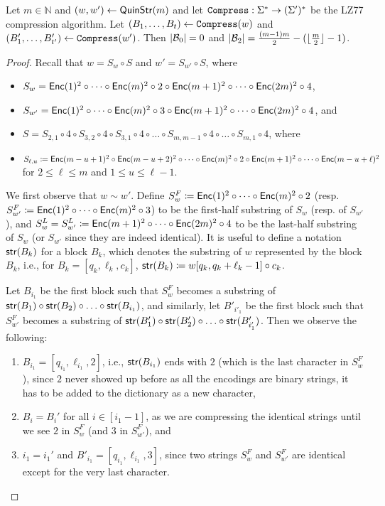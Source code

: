 \newcommand{\lemGS}{
Let $m\in\mathbb{N}$ and $(w,w')\gets\QuinStr(m)$ and let $\compress:\Sigma^*\rightarrow(\Sigma')^*$ be the LZ77 compression algorithm. Let $(B_1,\ldots,B_t)\gets\compress(w)$ and $(B'_1,\ldots,B'_{t'})\gets\compress(w')$. Then $|\B_0| = 0$ and $|\B_2| = \frac{(m-1)m}{2}-(\lfloor\frac{m}{2}\rfloor-1)$.
}
\begin{lemma}
    \lemGS
\end{lemma}

\begin{proof}
Recall that $w = S_w \circ S$ and $w' = S_{w'} \circ S$, where
\begin{itemize}
    \item $S_w =\mathsf{Enc}(1)^2\circ\cdots\circ\mathsf{Enc}(m)^2\circ 2 \circ\mathsf{Enc}(m+1)^2\circ\cdots\circ\mathsf{Enc}(2m)^2\circ 4$,
    \item $S_{w'}=\mathsf{Enc}(1)^2\circ\cdots\circ\mathsf{Enc}(m)^2\circ 3 \circ\mathsf{Enc}(m+1)^2\circ\cdots\circ\mathsf{Enc}(2m)^2\circ 4$, and
    \item $S=S_{2,1} \circ 4 \circ S_{3,2} \circ 4 \circ S_{3,1} \circ 4 \circ \ldots \circ S_{m,m-1} \circ 4 \circ \ldots \circ S_{m,1}\circ 4$, where
    \item $S_{\ell,u}\coloneqq\mathsf{Enc}(m-u+1)^2\circ\mathsf{Enc}(m-u+2)^2\circ\cdots\circ\mathsf{Enc}(m)^2\circ 2 \circ\mathsf{Enc}(m+1)^2\circ\cdots\circ\mathsf{Enc}(m-u+\ell)^2$ for $2\leq\ell\leq m$ and $1\leq u\leq \ell-1$.
\end{itemize}
We first observe that $w\sim w'$. Define $S_w^F\coloneqq \mathsf{Enc}(1)^2\circ\cdots\circ\mathsf{Enc}(m)^2\circ 2$ (resp. $S_{w'}^F\coloneqq \mathsf{Enc}(1)^2\circ\cdots\circ\mathsf{Enc}(m)^2\circ 3$) to be the first-half substring of $S_w$ (resp. of $S_{w'}$), and $S_w^L=S_{w'}^L\coloneqq \mathsf{Enc}(m+1)^2\circ\cdots\circ\mathsf{Enc}(2m)^2\circ 4$ to be the last-half substring of $S_w$ (or $S_{w'}$ since they are indeed identical). 
It is useful to define a notation $\mathsf{str}(B_k)$ for a block $B_k$, which denotes the substring of $w$ represented by the block $B_k$, i.e., for $B_k=[q_k,\ell_k,c_k]$, $\mathsf{str}(B_k)\coloneqq w[q_k,q_k+\ell_k-1]\circ c_k$. 

Let $B_{i_1}$ be the first block such that $S_w^F$ becomes a substring of $\mathsf{str}(B_1)\circ\mathsf{str}(B_2)\circ\ldots\circ\mathsf{str}(B_{i_1})$, and similarly, let $B'_{i'_1}$ be the first block such that $S_{w'}^F$ becomes a substring of $\mathsf{str}(B'_1)\circ\mathsf{str}(B'_2)\circ\ldots\circ\mathsf{str}(B'_{i'_1})$. Then we observe the following:
\begin{enumerate}
    \item $B_{i_1}=[q_{i_1},\ell_{i_1},2]$, i.e., $\mathsf{str}(B_{i_1})$ ends with $2$ (which is the last character in $S_w^F$), since $2$ never showed up before as all the encodings are binary strings, it has to be added to the dictionary as a new character,
    \item $B_i=B_i'$ for all $i\in[i_1-1]$, as we are compressing the identical strings until we see $2$ in $S_w^F$ (and $3$ in $S_{w'}^F$), and
    \item $i_1=i_1'$ and $B'_{i_1}=[q_{i_1},\ell_{i_1},3]$, since two strings $S_w^F$ and $S_{w'}^F$ are identical except for the very last character.\label{item:2}
\end{enumerate}


\end{proof}
